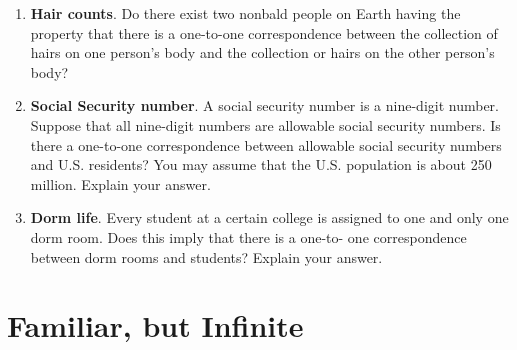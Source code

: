 \begin{enumerate}
\vfill 

\item \textbf{Hair counts}. Do there exist two nonbald people on Earth having the property that there is a one-to-one correspondence between the collection of hairs on one person's body and the collection or hairs on the other person's body? 

\vfill \item \textbf{Social Security number}. A social security number is a nine-digit number. Suppose that all nine-digit numbers are allowable social security numbers. Is there a one-to-one correspondence between allowable social security numbers and U.S. residents? You may assume that the U.S. population is about 250 million. Explain your answer.



\vfill \item \textbf{Dorm life}. Every student at a certain college is assigned to one and only one dorm room. Does this imply that there is a one-to- one correspondence between dorm rooms and students? Explain your answer. \vfill
\end{enumerate}

\clearpage
\section{Familiar, but Infinite}

